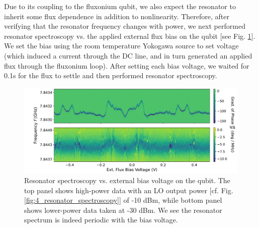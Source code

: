 Due to its coupling to the fluxonium qubit, we also expect the resonator to inherit some flux dependence in addition to nonlinearity. Therefore, after verifying that the resonator frequency changes with power, we next performed resonator spectroscopy vs. the applied external flux bias on the qubit [see Fig. \ref{fig:4_resonator_spectroscopy_vs_flux}]. We set the bias using the room temperature Yokogawa source to set voltage (which induced a current through the DC line, and in turn generated an applied flux through the fluxonium loop). After setting each bias voltage, we waited for 0.1s for the flux to settle and then performed resonator spectroscopy.  

\begin{figure}[h]
    \centering
    \includegraphics[width=\linewidth]{Figures/4/resonator_spectroscopy_vs_flux.pdf}
    \caption{Resonator spectroscopy vs. external bias voltage on the qubit. The top panel shows high-power data with an LO output power [cf. Fig. \ref{fig:4_resonator_spectroscopy}] of -10 dBm, while bottom panel shows lower-power data taken at -30 dBm. We see the resonator spectrum is indeed periodic with the bias voltage.}
\label{fig:4_resonator_spectroscopy_vs_flux}
\end{figure}

